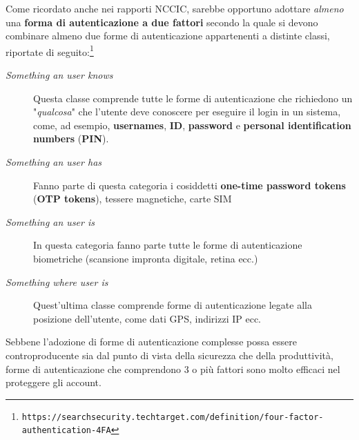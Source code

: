 \documentclass[10pt,a4paper, titlepage]{report}
\begin{document}
Come ricordato anche nei rapporti NCCIC, sarebbe opportuno adottare \textit{almeno} una \textbf{forma di autenticazione a due fattori} secondo la quale si devono combinare almeno due forme di autenticazione appartenenti a distinte classi, riportate di seguito:\footnote{\texttt{https://searchsecurity.techtarget.com/definition/four-factor-authentication-4FA}}
\begin{description}
\item[\textit{Something an user knows}] Questa classe comprende tutte le forme di autenticazione che richiedono un "\textit{qualcosa}" che l'utente deve conoscere per eseguire il login in un sistema, come, ad esempio, \textbf{usernames}, \textbf{ID}, \textbf{password} e \textbf{personal identification numbers} (\textbf{PIN}).
\item[\textit{Something an user has}] Fanno parte di questa categoria i cosiddetti \textbf{one-time password tokens} (\textbf{OTP tokens}), tessere magnetiche, carte SIM
\item[\textit{Something an user is}] In questa categoria fanno parte tutte le forme di autenticazione biometriche (scansione impronta digitale, retina ecc.)
\item[\textit{Something where user is}] Quest'ultima classe comprende forme di autenticazione legate alla posizione dell'utente, come dati  GPS, indirizzi IP ecc.
\end{description} 

Sebbene l'adozione di forme di autenticazione complesse possa essere controproducente sia dal punto di vista della sicurezza che della produttività, forme di autenticazione che comprendono 3 o più fattori sono molto efficaci nel proteggere gli account.

\listoftables
\lstlistoflistings
\end{document}
